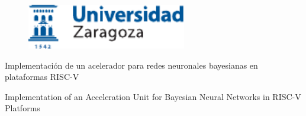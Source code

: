 \documentclass[a4paper,12pt,twoside,hidelinks]{report}
\begin{document}

\begin{titlepage}

\vspace*{-4mm}
\begin{figure}[!h]
  \centering
	\includegraphics[width=69.62mm]{Imagenes/UnizarLogo}
\end{figure}

\vspace*{17mm}

\fontsize{28pt}{28pt}\selectfont
\begin{center}
\setlength{\fboxsep}{3.4mm}
\end{center}

\vspace*{5mm}


\fontsize{20pt}{20pt}\selectfont
\begin{center}
Implementación de un acelerador para redes neuronales bayesianas en plataformas RISC-V
\end{center}
\baselineskip 20pt
\begin{center}
Implementation of an Acceleration Unit for Bayesian Neural Networks in RISC-V Platforms
\end{center}

\vspace*{1cm} 
\baselineskip 36pt
\begin{center}
\fontsize{12pt}{12pt}\selectfont
{}
\vspace*{3.65mm} 
\fontsize{18pt}{18pt}\selectfont
{}
\vspace*{1cm}
\baselineskip 36pt
\fontsize{12pt}{12pt}\selectfont
{}
\vspace*{3.56mm}
\fontsize{14pt}{14pt}\selectfont
{}
\vspace*{1cm}
\baselineskip 36pt
\fontsize{12pt}{12pt}\selectfont
{}
\vspace*{3.56mm}
\fontsize{14pt}{14pt}\selectfont
{}


\end{center}
\end{titlepage}
\end{document}
